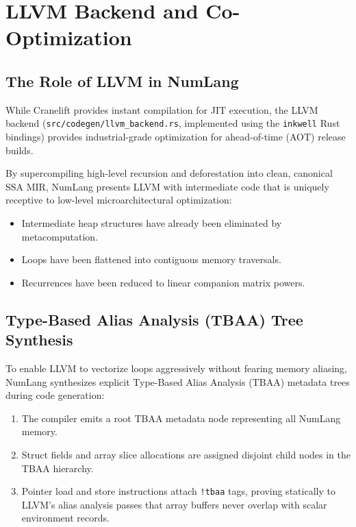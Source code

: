 \chapter{LLVM Backend and Co-Optimization}
\label{chap:llvm}

\section{The Role of LLVM in NumLang}
\label{sec:llvm:intro}

While Cranelift provides instant compilation for JIT execution, the LLVM backend (\texttt{src/codegen/llvm\_backend.rs}, implemented using the \texttt{inkwell} Rust bindings) provides industrial-grade optimization for ahead-of-time (AOT) release builds.

By supercompiling high-level recursion and deforestation into clean, canonical SSA MIR, NumLang presents LLVM with intermediate code that is uniquely receptive to low-level microarchitectural optimization:
\begin{itemize}
    \item Intermediate heap structures have already been eliminated by metacomputation.
    \item Loops have been flattened into contiguous memory traversals.
    \item Recurrences have been reduced to linear companion matrix powers.
\end{itemize}

\section{Type-Based Alias Analysis (TBAA) Tree Synthesis}
\label{sec:llvm:tbaa}

To enable LLVM to vectorize loops aggressively without fearing memory aliasing, NumLang synthesizes explicit Type-Based Alias Analysis (TBAA) metadata trees during code generation:
\begin{enumerate}
    \item The compiler emits a root TBAA metadata node representing all NumLang memory.
    \item Struct fields and array slice allocations are assigned disjoint child nodes in the TBAA hierarchy.
    \item Pointer load and store instructions attach \texttt{!tbaa} tags, proving statically to LLVM's alias analysis passes that array buffers never overlap with scalar environment records.
\end{enumerate}


